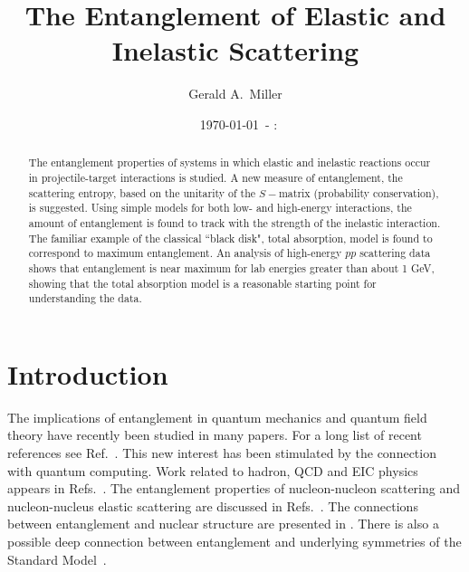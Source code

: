 \documentclass[prl,twocolumn,longbibliography,letterpaper,showpacs,groupedaddress,superscriptaddress,nofootinbib,floatfix,preprintnumbers,tightenlines]{revtex4-1}
\let\Oldsection\section
\renewcommand{\section}{\FloatBarrier\Oldsection}
\newcommand{\mydate}{\ \today \ - \number\hour :\number\minute}
\begin{document}
\title{
The  Entanglement   of  Elastic and Inelastic Scattering}

 

\author{Gerald A.~Miller}


 

 
\date{\mydate}



\begin{abstract}
  The entanglement properties of systems in which elastic and inelastic reactions occur in projectile-target interactions is studied. A new measure of entanglement, the scattering entropy, based on the unitarity of the $S-$matrix (probability conservation), is suggested. Using simple models for both low- and high-energy interactions,
the amount of entanglement is found to track with the strength of the inelastic interaction. The familiar example of the classical ``black disk", total absorption,  model is found to correspond to maximum entanglement. An analysis of high-energy $pp$ scattering data shows that entanglement is near maximum for lab energies greater than about 1 GeV, showing that the total absorption model is a reasonable starting point for understanding the data. 
   \end{abstract}
\maketitle


 \section{Introduction}



The implications of entanglement in quantum mechanics and quantum field theory have recently been studied in many papers.
For a long list of recent references see Ref.~\cite {Ehlers:2022oal}.
This  new interest  has been stimulated by the connection with quantum computing. Work related to hadron, QCD and  EIC  physics appears in
Refs.~\cite{Kharzeev:2017qzs,PhysRevC.99.015205,PhysRevD.102.074008,Hentschinski:2022rsa,PhysRevD.91.054026,Beane:2019loz}.  The entanglement properties of  nucleon-nucleon scattering and nucleon-nucleus elastic scattering are discussed in 
Refs.~\cite{Beane:2018oxh,Liu:2022grf,Miller:2023ujx,Bai:2023tey,Bai:2022hfv}. The connections between entanglement and  nuclear structure are presented in 
\cite{Johnson:2022mzk,Kruppa:2020rfa,Kruppa:2021yqs,Robin:2020aeh,Pazy:2022mmg,Tichai:2022bxr,Gu:2023aoc,Bulgac:2022ygo,Bulgac:2022cjg}.
There is also a  possible deep connection  between entanglement and underlying symmetries of the 
Standard Model~\cite{Cervera-Lierta:2017tdt,Beane:2018oxh,Liu:2022grf,Bai:2023tey,Miller:2023ujx}.
  
\end{document}
